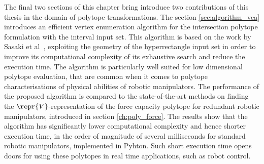 The final two sections of this chapter bring introduce two contributions of this thesis in the domain of polytope transformations. The section \ref{sec:algorithm_vea} introduces an efficient vertex enumeration algorithm for the intersection polytope formulation with the interval input set. This algorithm is based on the work by Sasaki et al~\cite{sasaki2011vertex}, exploiting the geometry of the hyperrectangle input set in order to improve its computational complexity of its exhaustive search and reduce the execution time. The algorithm is particularly well suited for low dimensional polytope evaluation, that are common when it comes to polytope characterisations of physical abilities of robotic manipulators. The performance of the proposed algorithm is compared to the state-of-the-art methods on finding the $\repr{V}$-representation of the force capacity polytope for redundant robotic manipulators, introduced in section \ref{ch:poly_force}. The results show that the algorithm has significantly lower computational complexity and hence shorter execution time, in the order of magnitude of several milliseconds for standard robotic manipulators, implemented in Pyhton. Such short execution time opens doors for using these polytopes in real time applications, such as robot control. 

